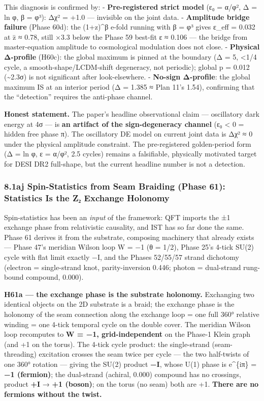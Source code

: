 \documentclass[
]{article}
\begin{document}
This diagnosis is confirmed by: - \textbf{Pre-registered strict model}
(ε₀ = α/φ², Δ = ln φ, β = φ³): Δχ² = +1.0 --- invisible on the joint
data. - \textbf{Amplitude bridge failure} (Phase 60d): the (1+z)\^{}β
e-fold running with β = φ³ gives ε\_eff = 0.032 at z̄ ≈ 0.78, still ×3.3
below the Phase 59 best-fit ε ≈ 0.106 --- the bridge from
master-equation amplitude to cosmological modulation does not close. -
\textbf{Physical Δ-profile} (H60c): the global maximum is pinned at the
boundary (Δ = 5, \textless1/4 cycle, a smooth-shape/LCDM-shift
degeneracy, not periodic); global p = 0.012 (\textasciitilde2.3σ) is not
significant after look-elsewhere. - \textbf{No-sign Δ-profile}: the
global maximum IS at an interior period (Δ = 1.385 ≈ Plan 11's 1.54),
confirming that the ``detection'' requires the anti-phase channel.

\textbf{Honest statement.} The paper's headline observational claim ---
oscillatory dark energy at 4σ --- is \textbf{an artifact of the
sign-degeneracy channel} (ε₀ \textless{} 0 = hidden free phase π). The
oscillatory DE model on current joint data is Δχ² ≈ 0 under the physical
amplitude constraint. The pre-registered golden-period form (Δ = ln φ, ε
= α/φ², 2.5 cycles) remains a falsifiable, physically motivated target
for DESI DR2 full-shape, but the current headline number is not a
detection.

\subsubsection{8.1aj Spin-Statistics from Seam Braiding (Phase 61):
Statistics Is the Z₂ Exchange
Holonomy}\label{aj-spin-statistics-from-seam-braiding-phase-61-statistics-is-the-zux2082-exchange-holonomy}

Spin-statistics has been an \emph{input} of the framework: QFT imports
the ±1 exchange phase from relativistic causality, and IST has so far
done the same. Phase 61 derives it from the substrate, composing
machinery that already exists --- Phase 47's meridian Wilson loop W = −1
(θ = 1/2), Phase 25's 4-tick SU(2) cycle with flat limit exactly −I, and
the Phases 52/55/57 strand dichotomy (electron = single-strand knot,
parity-inversion 0.446; photon = dual-strand rung-bound compound,
0.000).

\textbf{H61a --- the exchange phase is the substrate holonomy.}
Exchanging two identical objects on the 2D substrate is a braid; the
exchange phase is the holonomy of the seam connection along the exchange
loop = one full 360° relative winding = one 4-tick temporal cycle on the
double cover. The meridian Wilson loop recomputes to \textbf{W = −1,
grid-independent} on the Phase-1 Klein graph (and +1 on the torus). The
4-tick cycle product: the single-strand (seam-threading) excitation
crosses the seam twice per cycle --- the two half-twists of one 360°
rotation --- giving the SU(2) product \textbf{−I}, whose U(1) phase is
e\^{}\{iπ\} = \textbf{−1 (fermion)}; the dual-strand (achiral, 0.000)
compound has no crossings, product \textbf{+I} → \textbf{+1 (boson)}; on
the torus (no seam) both are +1. \textbf{There are no fermions without
the twist.}
\end{document}
